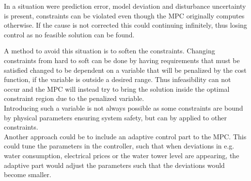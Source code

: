 In a situation were prediction error, model deviation and disturbance uncertainty is present, constraints can be violated even though the MPC originally computes otherwise. If the cause is not corrected this could continuing infinitely, thus losing control as no feasible solution can be found. 

A method to avoid this situation is to soften the constraints. Changing constraints from hard to soft can be done by having requirements that must be satisfied changed to be dependent on a variable that will be penalized by the cost function, if the variable is outside a desired range. Thus infeasibility can not occur and the MPC will instead try to bring the solution inside the optimal constraint region due to the penalized variable.\\   
Introducing such a variable is not always possible as some constraints are bound by physical parameters ensuring system safety, but can by applied to other constraints.\\

Another approach could be to include an adaptive control part to the MPC. This could tune the parameters in the controller, such that when deviations in e.g. water consumption, electrical prices or the water tower level are appearing, the adaptive part would adjust the parameters such that the deviations would become smaller.






